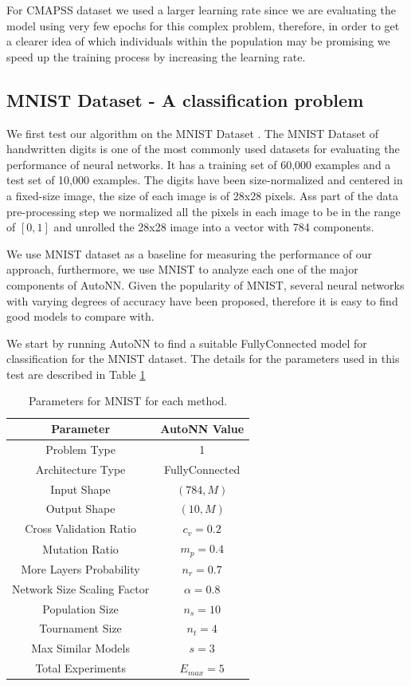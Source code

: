 \documentclass[journal]{IEEEtran}
\begin{document}
For CMAPSS dataset we used a larger learning rate since we are evaluating the model using very few epochs for this complex problem, therefore, in order to get a clearer idea of which individuals within the population may be promising we speed up the training process by increasing the learning rate.

\subsection{MNIST Dataset - A classification problem}

We first test our algorithm on the MNIST Dataset \cite{Lecun2010}. The MNIST Dataset of handwritten digits is one of the most commonly used datasets for evaluating the performance of neural networks. It has a training set of 60,000 examples and a test set of 10,000 examples. The digits have been size-normalized and centered in a fixed-size image, the size of each image is of 28x28 pixels. Ass part of the data pre-processing step we normalized all the pixels in each image to be in the range of $[0,1]$ and unrolled the 28x28 image into a vector with 784 components.

We use MNIST dataset as a baseline for measuring the performance of our approach, furthermore, we use MNIST to analyze each one of the major components of AutoNN. Given the popularity of MNIST, several neural networks with varying degrees of accuracy have been proposed, therefore it is easy to find good models to compare with. 

We start by running AutoNN to find a suitable FullyConnected model for classification for the MNIST dataset. The details for the parameters used in this test are described in Table \ref{table:MNIST_params}

\begin{table}[!htb]
\begin{center}
\begin{tabular}{| c | c |}
\hline
Parameter & AutoNN Value \\
\hline
Problem Type & 1 \\
Architecture Type & FullyConnected \\
Input Shape & $(784, M)$  \\
Output Shape & $(10, M)$ \\
Cross Validation Ratio & $c_v = 0.2$ \\
Mutation Ratio & $m_p = 0.4$ \\
More Layers Probability & $n_r = 0.7$ \\
Network Size Scaling Factor & $\alpha = 0.8$ \\
Population Size & $n_s = 10$ \\
Tournament Size & $n_t = 4$ \\
Max Similar Models & $s = 3$ \\
Total Experiments & $E_{max} = 5$ \\
\hline
\end{tabular}
\end{center}
\caption{Parameters for MNIST for each method.}
\label{table:MNIST_params}
\end{table}
\end{document}
